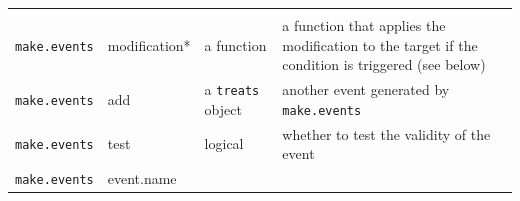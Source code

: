 \documentclass[
]{book}
\begin{document}
\begin{longtable}[]{@{}llll@{}}
\begin{minipage}[t]{0.33\columnwidth}
\end{minipage}\tabularnewline
\begin{minipage}[t]{0.19\columnwidth}\raggedright
\texttt{make.events}\strut
\end{minipage} & \begin{minipage}[t]{0.23\columnwidth}\raggedright
modification*\strut
\end{minipage} & \begin{minipage}[t]{0.14\columnwidth}\raggedright
a function\strut
\end{minipage} & \begin{minipage}[t]{0.33\columnwidth}\raggedright
a function that applies the modification to the target if the condition is triggered (see below)\strut
\end{minipage}\tabularnewline
\begin{minipage}[t]{0.19\columnwidth}\raggedright
\texttt{make.events}\strut
\end{minipage} & \begin{minipage}[t]{0.23\columnwidth}\raggedright
add\strut
\end{minipage} & \begin{minipage}[t]{0.14\columnwidth}\raggedright
a \texttt{treats} object\strut
\end{minipage} & \begin{minipage}[t]{0.33\columnwidth}\raggedright
another event generated by \texttt{make.events}\strut
\end{minipage}\tabularnewline
\begin{minipage}[t]{0.19\columnwidth}\raggedright
\texttt{make.events}\strut
\end{minipage} & \begin{minipage}[t]{0.23\columnwidth}\raggedright
test\strut
\end{minipage} & \begin{minipage}[t]{0.14\columnwidth}\raggedright
logical\strut
\end{minipage} & \begin{minipage}[t]{0.33\columnwidth}\raggedright
whether to test the validity of the event\strut
\end{minipage}\tabularnewline
\begin{minipage}[t]{0.19\columnwidth}\raggedright
\texttt{make.events}\strut
\end{minipage} & \begin{minipage}[t]{0.23\columnwidth}\raggedright
event.name\strut
\end{minipage} & \begin{minipage}[t]{0.14\columnwidth}\raggedright

\end{minipage}
\end{longtable}
\end{document}
